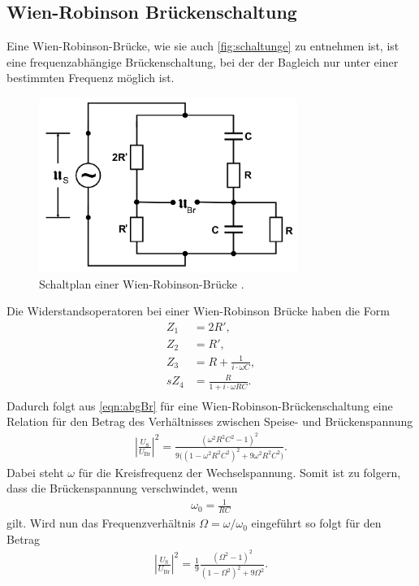 \subsection{Wien-Robinson Brückenschaltung}
Eine Wien-Robinson-Brücke, wie sie auch \autoref{fig:schaltunge} zu entnehmen ist, ist eine frequenzabhängige 
Brückenschaltung, bei der der Bagleich nur unter einer bestimmten Frequenz möglich ist.
\begin{figure}[H]
    \centering
    \includegraphics[width=0.75\textwidth]{dateien/aufgabee).png}
    \caption{Schaltplan einer Wien-Robinson-Brücke \cite{anleitung}.}
    \label{fig:schaltunge}
\end{figure}

\sloppy
Die Widerstandsoperatoren bei einer Wien-Robinson Brücke haben die Form
\begin{align*}
    Z_1 &= 2R', \\
    Z_2 &= R' , \\
    Z_3 &= R + \frac{1}{i\cdot\omega C} , \\s
    Z_4 &= \frac{R}{1+i\cdot\omega RC} . \\
\end{align*}
Dadurch folgt aus \autoref{eqn:abgBr} für eine Wien-Robinson-Brückenschaltung eine Relation für den Betrag des Verhältnisses
zwischen Speise- und Brückenspannung
\begin{align}
    |\frac{U_{\text{S}}}{U_{\text{Br}}}|^2 = \frac{(\omega^2 R^2C^2-1)^2}{9\Big((1-\omega^2R^2C^2)^2 + 9\omega^2R^2C^2\Big)}.
    \label{eqn:theo}
\end{align}
Dabei steht $\omega$ für die Kreisfrequenz der Wechselspannung.
Somit ist zu folgern, dass die Brückenspannung verschwindet, wenn 
\begin{align*}
    \omega_0 = \frac{1}{RC}
\end{align*}
gilt. Wird nun das Frequenzverhältnis $\Omega = \omega/\omega_0$ eingeführt so folgt für den Betrag
\begin{align}
    |\frac{U_{\text{S}}}{U_{\text{Br}}}|^2 = \frac 19 \frac{(\Omega^2-1)^2}{(1-\Omega^2)^2+9\Omega^2}.
    \label{eqn:wienRGl}
\end{align}

